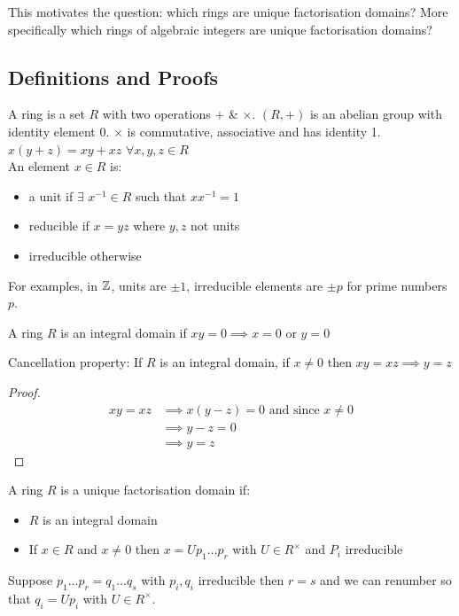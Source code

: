 \documentclass[11pt]{article}
\begin{document}
$ $\\[1em]
This motivates the question: which rings are unique factorisation domains? 
More specifically which rings of algebraic integers are unique factorisation domains?

\subsection{Definitions and Proofs}
A ring is a set $R$ with two operations $ + $ \& $  \times $. 
$(R, +)$ is an abelian group with identity element $0$. 
$\times $ is commutative, associative and has identity 1. 
$x(y+z) = xy+xz$ $\forall x,y,z \in R$
$ $\\[1em]
An element $x \in R$ is:
\begin{itemize}
	\item{a unit if $\exists $ $x^{-1} \in R $ such that $xx^{-1} = 1$ }
	\item{reducible if $x=yz $ where $y,z$ not units}
	\item{irreducible otherwise}
\end{itemize}
For examples, in $\mathbb{Z}$, units are $\pm1$, irreducible elements are $\pm p $ for prime numbers $p$.

\begin{defn}
	A ring $R$ is an integral domain if $xy=0 \implies x=0$ or $y=0$
\end{defn}
\begin{lemma}
	Cancellation property: If $R$ is an integral domain, if $x \neq 0$ then $xy=xz \implies y=z$
\end{lemma}
\begin{proof}
	\begin{align*}
	xy =xz &\implies x(y-z) = 0 \text{ and since } x\neq 0\\
		&\implies y-z =0 \\
		&\implies y=z
	\end{align*}
\end{proof}
$ $\\
A ring $R$ is a unique factorisation domain if:
\begin{itemize}
	\item{$R$ is an integral domain}
	\item{If $x \in R$ and $x \neq 0 $ then $x=Up_1 \dots p_r$  with $U \in R^\times $ and $P_i$ irreducible }
\end{itemize}
$ $\\
Suppose $p_1 \dots p_r  = q_1 \dots q_s$ with $p_i, q_i$ irreducible then $r=s$ and we can renumber so that $q_i = Up_i$ with $U \in R^\times$.
\end{document}
